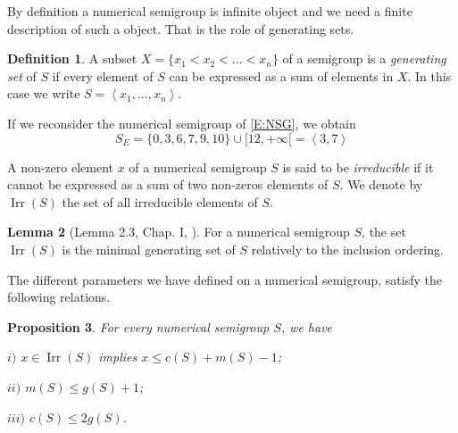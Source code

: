 \documentclass[reqno,11pt]{amsart}
\theoremstyle{plain}
\newtheorem{prop}{Proposition}[section]
\theoremstyle{definition}
\newtheorem{defi}[prop]{Definition}
\newtheorem{lem}[prop]{Lemma}
\renewcommand{\leq}{\leqslant}
\DeclareMathOperator{\Irr}{Irr}
\begin{document}
By definition a numerical semigroup is infinite object and we need a finite description of such a object. 
That is the role of generating sets.


\begin{defi}
A subset $X=\{x_1<x_2<...<x_n\}$ of a semigroup is a \emph{generating set} of $S$ if every element of $S$ can be expressed as a sum of elements in $X$. 
In this case we write $S=\left<x_1,...,x_n\right>$.
\end{defi}

If we reconsider the numerical semigroup of \eqref{E:NSG}, we obtain
\begin{equation}
\label{E:GNSG}
S_E=\{0,3,6,7,9,10\}\cup[12,+\infty[=\left<3,7\right>
\end{equation}


A non-zero element $x$ of a numerical semigroup $S$ is said to be \emph{irreducible} if it cannot be expressed as a sum of two non-zeros elements of $S$.  
We denote by $\Irr(S)$ the set of all irreducible elements of $S$.

\begin{lem}[Lemma 2.3, Chap. I, \cite{BookNS}]
For a numerical semigroup $S$, the set $\Irr(S)$ is the minimal generating set of $S$ relatively to the inclusion ordering.
\end{lem} 


The different parameters we have defined on a numerical semigroup, satisfy the following relations.

\begin{prop}
\label{P:Res}
For every  numerical semigroup  $S$,  we have

$i)$  $x\in \Irr(S)$ implies $x\leq c(S)+m(S)-1$;

$ii)$ $m(S)\leq g(S)+1$;

$iii)$ $c(S)\leq 2 g(S)$.
\end{prop}
\end{document}
